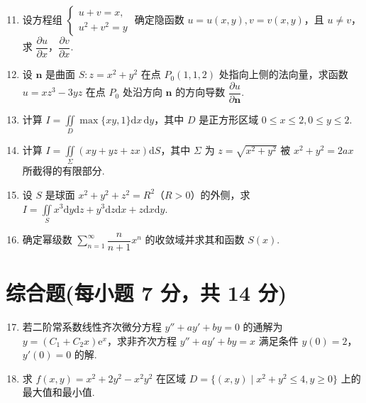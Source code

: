 \documentclass[../main.tex]{subfiles}
\begin{document}
\begin{enumerate}
    \setcounter{enumi}{10}
    \item 设方程组 \( \begin{cases} u + v = x, \\ u^2 + v^2 = y \end{cases} \) 确定隐函数 \( u = u(x,y), v = v(x,y) \)，且 \( u \neq v \)，求 \( \dfrac{\partial u}{\partial x} \)，\( \dfrac{\partial v}{\partial x} \).
          \vspace{15em}

    \item 设 \( \boldsymbol{n} \) 是曲面 \( S: z = x^2 + y^2 \) 在点 \( P_0(1,1,2) \) 处指向上侧的法向量，求函数 \( u = xz^3 - 3yz \) 在点 \( P_0 \) 处沿方向 \( \boldsymbol{n} \) 的方向导数 \( \dfrac{\partial u}{\partial \boldsymbol{n}} \).
          \vspace{9em}

    \item 计算 \( I = \displaystyle \iint \limits_D \max\{xy, 1\} \mathrm{d}x\,\mathrm{d}y \)，其中 \( D \) 是正方形区域 \( 0 \leq x \leq 2, 0 \leq y \leq 2 \).
          \vspace{9em}

    \item 计算 \( I = \displaystyle \iint \limits_{\Sigma} (xy + yz + zx) \mathrm{d}S \)，其中 \( \Sigma \) 为 \( z = \sqrt{x^2 + y^2} \) 被 \( x^2 + y^2 = 2ax \) 所截得的有限部分.
          \vspace{9em}

    \item 设 \( S \) 是球面 \( x^2 + y^2 + z^2 = R^2 \)（\( R > 0 \)）的外侧，求 \( I = \displaystyle \iint \limits_S x^3 \mathrm{d}y \mathrm{d}z + y^3 \mathrm{d}z \mathrm{d}x + z \mathrm{d}x \mathrm{d}y \).
          \vspace{9em}

    \item 确定幂级数 \( \sum \limits_{n=1}^{\infty} \dfrac{n}{n+1} x^n \) 的收敛域并求其和函数 \( S(x) \).
          \vspace{9em}
\end{enumerate}

\section{综合题(每小题 7 分，共 14 分)}
\begin{enumerate}
    \setcounter{enumi}{16}
    \item 若二阶常系数线性齐次微分方程 \( y'' + ay' + by = 0 \) 的通解为 \( y = (C_1 + C_2 x)\mathrm{e}^x \)，求非齐次方程 \( y'' + ay' + by = x \) 满足条件 \( y(0) = 2 \)，\( y'(0) = 0 \) 的解.
          \vspace{10em}

    \item 求 \( f(x, y) = x^2 + 2y^2 - x^2 y^2 \) 在区域 \( D = \{(x, y) \mid x^2 + y^2 \leq 4, y \geq 0\} \) 上的最大值和最小值.
          \vspace{10em}
\end{enumerate}
\end{document}
